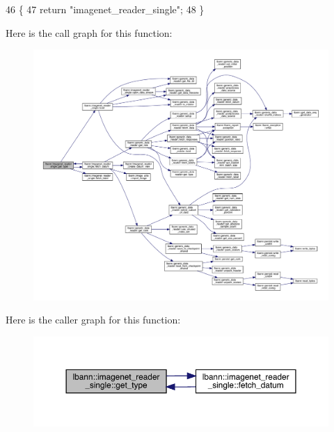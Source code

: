 \begin{DoxyCode}
46                                       \{
47     \textcolor{keywordflow}{return} \textcolor{stringliteral}{"imagenet\_reader\_single"};
48   \}
\end{DoxyCode}
Here is the call graph for this function\+:\nopagebreak
\begin{figure}[H]
\begin{center}
\leavevmode
\includegraphics[width=350pt]{classlbann_1_1imagenet__reader__single_aecd9cec6777e4a7485daa5b0396afee0_cgraph}
\end{center}
\end{figure}
Here is the caller graph for this function\+:\nopagebreak
\begin{figure}[H]
\begin{center}
\leavevmode
\includegraphics[width=350pt]{classlbann_1_1imagenet__reader__single_aecd9cec6777e4a7485daa5b0396afee0_icgraph}
\end{center}
\end{figure}
\mbox{\label{classlbann_1_1imagenet__reader__single_a7ea768d9784b7a9532551d7402ee4f8e}} 
